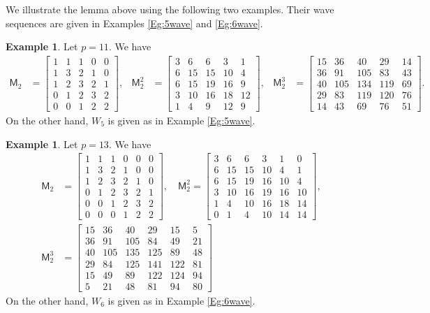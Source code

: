 \documentclass[12pt,reqno]{amsart}
\newcommand{\M}{\mathsf{M}}
\theoremstyle{definition}
\newtheorem{eg}[thm]{Example}
\numberwithin{equation}{section}
\begin{document}
We illustrate the lemma above using the following two examples. Their wave sequences are given in Examples \ref{Eg:5wave} and \ref{Eg:6wave}. 

\begin{eg}\label{Eg:p11M2}
    Let $p=11$. We have 
\begin{align*}\M_2&= \begin{bmatrix} 1 & 1 & 1 & 0 & 0 \\
1 & 3 & 2 & 1 & 0 \\
1 & 2 & 3 & 2 & 1 \\
0 & 1 & 2 & 3 & 2 \\
0 & 0 & 1 & 2 & 2
\end{bmatrix},& 
\M_2^2&=\begin{bmatrix}
3&6&6&3&1\\
6&15&15&10&4\\
6&15&19&16&9\\
3&10&16&18&12\\
1&4&9&12&9
\end{bmatrix},& \M_2^3&=\begin{bmatrix}
15&36&40&29&14\\
36&91&105&83&43\\
40&105&134&119&69\\
29&83&119&120&76\\
14&43&69&76&51
\end{bmatrix}.
\end{align*} On the other hand, $W_5$ is given as in Example \ref{Eg:5wave}.
\end{eg}

\begin{eg}\label{Eg:p13M2}
    Let $p=13$. We have 
    \begin{align*}
        \M_2&=\begin{bmatrix}
        1&1&1&0&0&0\\ 1&3&2&1&0&0\\
        1&2&3&2&1&0\\
        0&1&2&3&2&1\\
        0&0&1&2&3&2\\
        0&0&0&1&2&2
    \end{bmatrix}, \quad
    \M_2^2=
\begin{bmatrix}
3&6&6&3&1&0\\
6&15&15&10&4&1\\
6&15&19&16&10&4\\
3&10&16&19&16&10\\
1&4&10&16&18&14\\
0&1&4&10&14&14
\end{bmatrix},\\
\M_2^3&=\begin{bmatrix}
15&36&40&29&15&5\\
36&91&105&84&49&21\\
40&105&135&125&89&48\\
29&84&125&141&122&81\\
15&49&89&122&124&94\\
5&21&48&81&94&80
\end{bmatrix}
    \end{align*} On the other hand, $W_6$ is given as in Example \ref{Eg:6wave}.
\end{eg}
\end{document}
